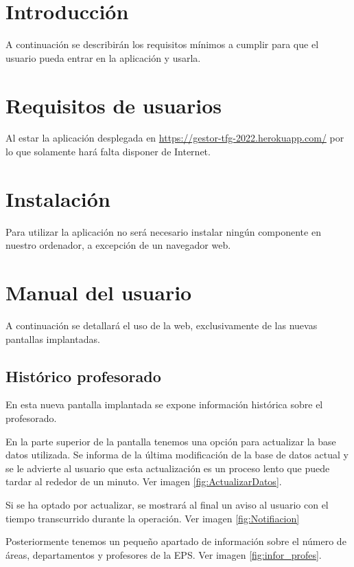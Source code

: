 
\section{Introducción}
A continuación se describirán los requisitos mínimos a cumplir para que el usuario pueda entrar en la aplicación y usarla.

\section{Requisitos de usuarios}
 Al estar la aplicación desplegada en \href{https://gestor-tfg-2022.herokuapp.com/}{https://gestor-tfg-2022.herokuapp.com/} por lo que solamente hará falta disponer de Internet.
\section{Instalación}
Para utilizar la aplicación no será necesario instalar ningún componente en nuestro ordenador, a excepción de un navegador web.
\section{Manual del usuario}
A continuación se detallará el uso de la web, exclusivamente de las nuevas pantallas implantadas.
\subsection{Histórico profesorado}
En esta nueva pantalla implantada se expone información histórica sobre el profesorado.

En la parte superior de la pantalla tenemos una opción para actualizar la base datos utilizada. Se informa de la última modificación de la base de datos actual y se le advierte al usuario que esta actualización es un proceso lento que puede tardar al rededor de un minuto. Ver imagen \ref{fig:ActualizarDatos}.


Si se ha optado por actualizar, se mostrará al final un aviso al usuario con el tiempo transcurrido durante la operación. Ver imagen \ref{fig:Notifiacion}


Posteriormente tenemos un pequeño apartado de información sobre el número de áreas, departamentos y profesores de la EPS. Ver imagen \ref{fig:infor_profes}.

